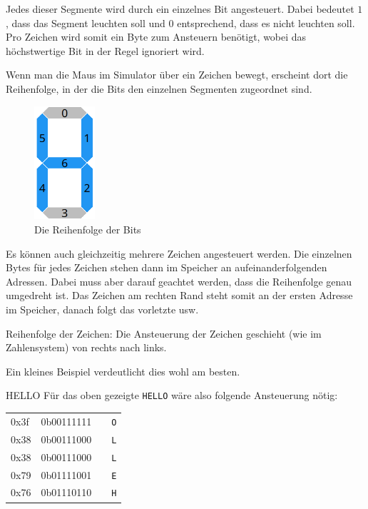 Jedes dieser Segmente wird durch ein einzelnes Bit angesteuert. Dabei bedeutet $1$, dass das Segment leuchten soll und $0$ entsprechend, dass es nicht leuchten soll.
Pro Zeichen wird somit ein Byte zum Ansteuern benötigt, wobei das höchstwertige Bit in der Regel ignoriert wird.

Wenn man die Maus im Simulator über ein Zeichen bewegt, erscheint dort die Reihenfolge, in der die Bits den einzelnen Segmenten zugeordnet sind.

\begin{figure}[ht]
	\centering
  \includegraphics[width=0.2\textwidth]{Images/7-Segment_Hover}
	\caption{Die Reihenfolge der Bits}
	\label{7-Segment_Hover}
\end{figure}

Es können auch gleichzeitig mehrere Zeichen angesteuert werden. Die einzelnen
Bytes für jedes Zeichen stehen dann im Speicher an aufeinanderfolgenden
Adressen. Dabei muss aber darauf geachtet werden, dass die Reihenfolge genau
umgedreht ist. Das Zeichen am rechten Rand steht somit an der ersten Adresse im
Speicher, danach folgt das vorletzte usw.

\begin{warningblock}
Reihenfolge der Zeichen: Die Ansteuerung der Zeichen geschieht (wie im Zahlensystem) von rechts nach links.
\end{warningblock}

Ein kleines Beispiel verdeutlicht dies wohl am besten.

\begin{exampleblock}{HELLO}
	Für das oben gezeigte \texttt{HELLO} wäre also folgende Ansteuerung nötig:\\
	\begin{tabular}{llll}
	0x3f & 0b00111111 & & \texttt{O}\\
	0x38 & 0b00111000 & & \texttt{L}\\
	0x38 & 0b00111000 & & \texttt{L}\\
	0x79 & 0b01111001 & & \texttt{E}\\
	0x76 & 0b01110110 & & \texttt{H}\\
	\end{tabular}
\end{exampleblock}

